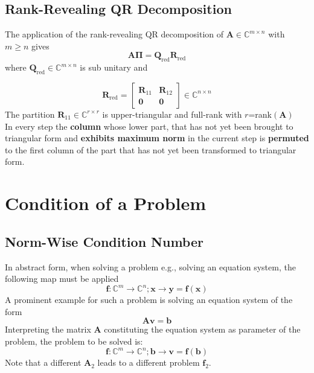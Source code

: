 \documentclass[english]{latex4ei/latex4ei_sheet}
\begin{document}
\begin{sectionbox}
    \subsection{Rank-Revealing QR Decomposition}
    The application of the rank-revealing QR decomposition of $\mathbf{A}\in\mathbb{C}^{m\times n}$ with $m\geq n$ gives
    $$\mathbf{A}\mathbf{\Pi} = \mathbf{Q}_\text{red} \mathbf{R}_\text{red}$$
    where $\mathbf{Q}_\text{red}\in\mathbb{C}^{m\times n}$ is sub unitary and

    $$\mathbf{R}_\text{red} = \begin{bmatrix}
            \mathbf{R}_{11} & \mathbf{R}_{12} \\
            \mathbf{0}      & \mathbf{0}
        \end{bmatrix}\in\mathbb{C}^{n\times n}$$
    The partition $\mathbf{R}_{11}\in \mathbb{C}^{r\times r}$ is upper-triangular and full-rank with $r$=rank$(\mathbf{A})$\\
    In every step the \textbf{column} whose lower part, that has not yet been brought to triangular form and \textbf{exhibits maximum norm} in the current step is \textbf{permuted} to the first column of the part that has not yet been transformed to triangular form.
\end{sectionbox}
\section{Condition of a Problem}
\begin{sectionbox}
    \subsection{Norm-Wise Condition Number}
    In abstract form, when solving a problem e.g., solving an equation system, the following map must be applied
    $$\mathbf{f}:\mathbb{C}^m \to \mathbb{C}^n; \mathbf{x}\to\mathbf{y}=\mathbf{f}(\mathbf{x})$$
    A prominent example for such a problem is solving an equation system of the form
    $$\mathbf{A}\mathbf{v} = \mathbf{b}$$
    Interpreting the matrix $\mathbf{A}$ constituting the equation system as parameter of the problem, the problem to be solved is:
    $$\mathbf{f}:\mathbb{C}^m \to \mathbb{C}^n; \mathbf{b}\to\mathbf{v}=\mathbf{f}(\mathbf{b})$$
    Note that a different $\mathbf{A}_2$ leads to a different problem $\mathbf{f}_2$.
\end{sectionbox}
\end{document}
